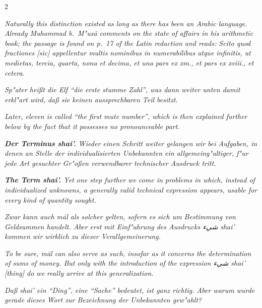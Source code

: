 \documentclass[10pt,a4paper]{article}
\newcommand{\RL}[1]{\beginR#1\endR}
\newcommand{\ar}[1]{{\arabicfont\RL{#1}}}
\newcommand{\enquote}[1]{``#1''}
\begin{document}
\begin{paracol}{2}
\switchcolumn

\textit{Naturally this distinction existed as long as there has been an Arabic language. Already Muhammad b.\ M"us\=a comments on the state of affairs in his arithmetic book; the passage is found on p.\ 17 of the Latin redaction and reads: \textit{Scito quod fractiones [sic] appellentur multis nominibus in numerabilibus atque infinitis, ut medietas, tercia, quarta, nona et decima, et una pars ex xm., et pars ex xviii., et cetera.}}

\switchcolumn*

\textit{Sp"ater hei\ss{}t die Elf \enquote{die erste stumme Zahl}, was dann weiter unten damit erkl"art wird, da\ss{} sie keinen aussprechbaren Teil besitzt.}

\switchcolumn

\textit{Later, eleven is called \enquote{the first mute number}, which is then explained further below by the fact that it possesses no pronounceable part.}

\switchcolumn*

\textit{\textbf{Der Terminus \textit{shai'}.} Wieder einen Schritt weiter gelangen wir bei Aufgaben, in denen an Stelle der individualisierten Unbekannten ein allgemeing"ultiger, f"ur jede Art gesuchter Gr"o\ss{}en verwendbarer technischer Ausdruck tritt.}

\switchcolumn

\textit{\textbf{The Term \textit{shai'}.} Yet one step further we come in problems in which, instead of individualized unknowns, a generally valid technical expression appears, usable for every kind of quantity sought.}

\switchcolumn*

\textit{Zwar kann auch \textit{m\=al} als solcher gelten, sofern es sich um Bestimmung von Geldsummen handelt. Aber erst mit Einf"uhrung des Ausdrucks \ar{شيء} \textit{shai'} kommen wir wirklich zu dieser Verallgemeinerung.}

\switchcolumn

\textit{To be sure, \textit{m\=al} can also serve as such, insofar as it concerns the determination of sums of money. But only with the introduction of the expression \ar{شيء} \textit{shai'} [thing] do we really arrive at this generalization.}

\switchcolumn*

\textit{Da\ss{} \textit{shai'} ein \enquote{Ding}, eine \enquote{Sache} bedeutet, ist ganz richtig. Aber warum wurde gerade dieses Wort zur Bezeichnung der Unbekannten gew"ahlt?}


\end{paracol}
\end{document}
